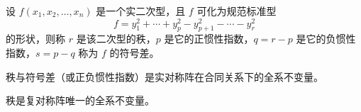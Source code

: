 \begin{definition}
  设 $f(x_1, x_2, \ldots, x_n)$ 是一个实二次型，且 $f$ 可化为规范标准型
  \[
      f = y_{1}^{2} + \cdots + y_{p}^{2} - y_{p + 1}^{2} - \cdots - y_{r}^{2}
  \]
  的形状，则称 $r$ 是该二次型的秩，$p$ 是它的正惯性指数，$q = r - p$ 是它的负惯性指数，$s = p - q$ 称为 $f$ 的符号差。
\end{definition}

\begin{theorem}
  秩与符号差（或正负惯性指数）是实对称阵在合同关系下的全系不变量。
\end{theorem}

\begin{theorem}
  秩是复对称阵唯一的全系不变量。
\end{theorem}


\section{}







\section{}







\section{}







\section{}







\section{}






